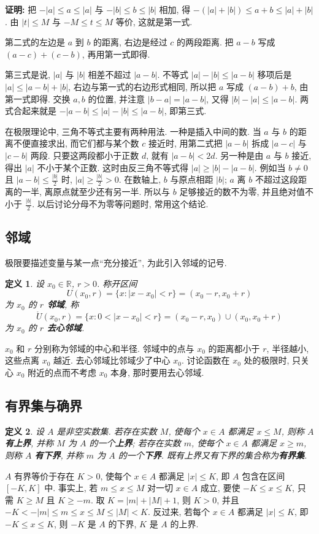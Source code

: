 \documentclass[UTF8,openany]{ctexbook}
\theoremstyle{chinesetextbook}
\newtheorem{definition}{定义}[section]
\newenvironment{cnproof}{\par\indent\textbf{证明:} \ignorespaces}{\par}
\begin{document}
\begin{cnproof}
把 $-|a|\le a\le|a|$ 与 $-|b|\le b\le|b|$ 相加, 得 $-(|a|+|b|)\le a+b\le|a|+|b|$. 由 $|t|\le M$ 与 $-M\le t\le M$ 等价, 这就是第一式.

第二式的左边是 $a$ 到 $b$ 的距离, 右边是经过 $c$ 的两段距离. 把 $a-b$ 写成 $(a-c)+(c-b)$, 再用第一式即得.

第三式是说, $|a|$ 与 $|b|$ 相差不超过 $|a-b|$. 不等式 $|a|-|b|\le|a-b|$ 移项后是 $|a|\le|a-b|+|b|$, 右边与第一式的右边形式相同, 所以把 $a$ 写成 $(a-b)+b$, 由第一式即得. 交换 $a,b$ 的位置, 并注意 $|b-a|=|a-b|$, 又得 $|b|-|a|\le|a-b|$. 两式合起来就是 $-|a-b|\le|a|-|b|\le|a-b|$, 即第三式.
\end{cnproof}
在极限理论中, 三角不等式主要有两种用法. 一种是插入中间的数. 当 $a$ 与 $b$ 的距离不便直接求出, 而它们都与某个数 $c$ 接近时, 用第二式把 $|a-b|$ 拆成 $|a-c|$ 与 $|c-b|$ 两段. 只要这两段都小于正数 $d$, 就有 $|a-b|<2d$. 另一种是由 $a$ 与 $b$ 接近, 得出 $|a|$ 不小于某个正数. 这时由反三角不等式得 $|a|\ge|b|-|a-b|$. 例如当 $b\ne0$ 且 $\displaystyle|a-b|\le\frac{|b|}2$ 时, $\displaystyle|a|\ge\frac{|b|}2>0$. 在数轴上, $b$ 与原点相距 $|b|$; $a$ 离 $b$ 不超过这段距离的一半, 离原点就至少还有另一半. 所以与 $b$ 足够接近的数不为零, 并且绝对值不小于 $\displaystyle\frac{|b|}2$. 以后讨论分母不为零等问题时, 常用这个结论.
\subsection{邻域}
极限要描述变量与某一点“充分接近”, 为此引入邻域的记号.
\begin{definition}
设 $x_0\in\mathbb R$, $r>0$. 称开区间
\[
U(x_0,r)=\{x:|x-x_0|<r\}=(x_0-r,x_0+r)
\]
为 $x_0$ 的 \textbf{$r$ 邻域}, 称
\[
\mathring U(x_0,r)=\{x:0<|x-x_0|<r\}=(x_0-r,x_0)\cup(x_0,x_0+r)
\]
为 $x_0$ 的 \textbf{$r$ 去心邻域}.
\end{definition}
$x_0$ 和 $r$ 分别称为邻域的中心和半径. 邻域中的点与 $x_0$ 的距离都小于 $r$, 半径越小, 这些点离 $x_0$ 越近. 去心邻域比邻域少了中心 $x_0$. 讨论函数在 $x_0$ 处的极限时, 只关心 $x_0$ 附近的点而不考虑 $x_0$ 本身, 那时要用去心邻域.
\subsection{有界集与确界}
\begin{definition}
设 $A$ 是非空实数集. 若存在实数 $M$, 使每个 $x\in A$ 都满足 $x\le M$, 则称 $A$ \textbf{有上界}, 并称 $M$ 为 $A$ 的一个\textbf{上界}; 若存在实数 $m$, 使每个 $x\in A$ 都满足 $x\ge m$, 则称 $A$ \textbf{有下界}, 并称 $m$ 为 $A$ 的一个\textbf{下界}. 既有上界又有下界的集合称为\textbf{有界集}.
\end{definition}
$A$ 有界等价于存在 $K>0$, 使每个 $x\in A$ 都满足 $|x|\le K$, 即 $A$ 包含在区间 $[-K,K]$ 中. 事实上, 若 $m\le x\le M$ 对一切 $x\in A$ 成立, 要使 $-K\le x\le K$, 只需 $K\ge M$ 且 $K\ge-m$. 取 $K=|m|+|M|+1$, 则 $K>0$, 并且 $-K<-|m|\le m\le x\le M\le|M|<K$. 反过来, 若每个 $x\in A$ 都满足 $|x|\le K$, 即 $-K\le x\le K$, 则 $-K$ 是 $A$ 的下界, $K$ 是 $A$ 的上界.
\end{document}
